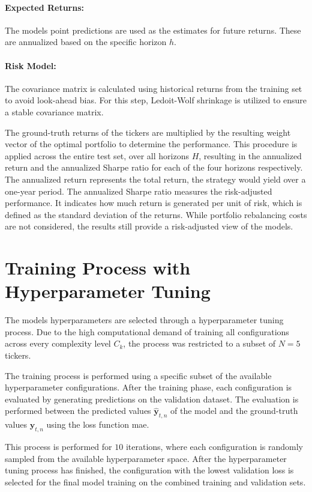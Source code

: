 \documentclass[12pt,twoside=false,a4paper,parskip]{scrbook}
\begin{document}
\paragraph{Expected Returns:} The models point predictions are used as the estimates for future returns. These are annualized based on the specific horizon $h$.
\paragraph{Risk Model:} The covariance matrix is calculated using historical returns from the training set to avoid look-ahead bias. For this step, Ledoit-Wolf shrinkage is utilized to ensure a stable covariance matrix.

The ground-truth returns of the tickers are multiplied by the resulting weight vector of the optimal portfolio to determine the performance. 
This procedure is applied across the entire test set, over all horizons $H$, resulting in the annualized return and the annualized Sharpe ratio 
for each of the four horizons respectively. 
The annualized return represents the total return, the strategy would yield over a one-year period. The annualized Sharpe ratio measures the risk-adjusted performance. It indicates how much return is generated per unit of risk, which is defined as the standard deviation of the returns.
While portfolio rebalancing costs are not considered, the results still provide a risk-adjusted view of the models. 

\section{Training Process with Hyperparameter Tuning}
The models hyperparameters are selected through a hyperparameter tuning process. Due to the high computational demand of training all configurations across every complexity level $C_k$, the process was restricted to a subset of $N = 5$ tickers.

The training process is performed using a specific subset of the available hyperparameter configurations. After the training phase, each configuration is evaluated by generating predictions on the validation dataset. The evaluation is performed between the predicted values $\hat{\mathbf{y}}_{t, n}$ of the model and the ground-truth values $\mathbf{y}_{t, n}$ using the loss function \gls{mae}. 

This process is performed for $10$ iterations, where each configuration is randomly sampled from the available hyperparameter space. After the hyperparameter tuning process has finished, the configuration with the lowest validation loss is selected for the final model training on the combined training and validation sets.
\end{document}
